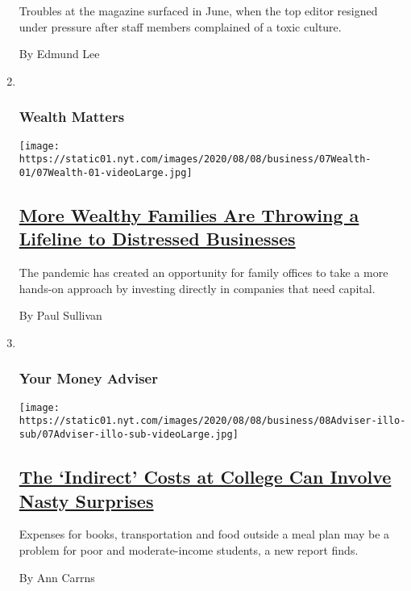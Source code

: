 \begin{enumerate}
  Troubles at the magazine surfaced in June, when the top editor
  resigned under pressure after staff members complained of a toxic
  culture.

  By Edmund Lee
\item ~
  \hypertarget{wealth-matters}{%
  \subsubsection{Wealth Matters}\label{wealth-matters}}

  \texttt{[image: https://static01.nyt.com/images/2020/08/08/business/07Wealth-01/07Wealth-01-videoLarge.jpg]}

  \hypertarget{more-wealthy-families-are-throwing-a-lifeline-to-distressed-businesses}{%
  \subsection{\texorpdfstring{\href{/2020/08/07/your-money/family-office-direct-investment.html}{More
  Wealthy Families Are Throwing a Lifeline to Distressed
  Businesses}}{More Wealthy Families Are Throwing a Lifeline to Distressed Businesses}}\label{more-wealthy-families-are-throwing-a-lifeline-to-distressed-businesses}}

  The pandemic has created an opportunity for family offices to take a
  more hands-on approach by investing directly in companies that need
  capital.

  By Paul Sullivan
\item ~
  \hypertarget{your-money-adviser}{%
  \subsubsection{Your Money Adviser}\label{your-money-adviser}}

  \texttt{[image: https://static01.nyt.com/images/2020/08/08/business/08Adviser-illo-sub/07Adviser-illo-sub-videoLarge.jpg]}

  \hypertarget{the-indirect-costs-at-college-can-involve-nasty-surprises}{%
  \subsection{\texorpdfstring{\href{/2020/08/07/your-money/college-costs-tuition.html}{The
  `Indirect' Costs at College Can Involve Nasty
  Surprises}}{The `Indirect' Costs at College Can Involve Nasty Surprises}}\label{the-indirect-costs-at-college-can-involve-nasty-surprises}}

  Expenses for books, transportation and food outside a meal plan may be
  a problem for poor and moderate-income students, a new report finds.

  By Ann Carrns
\end{enumerate}

